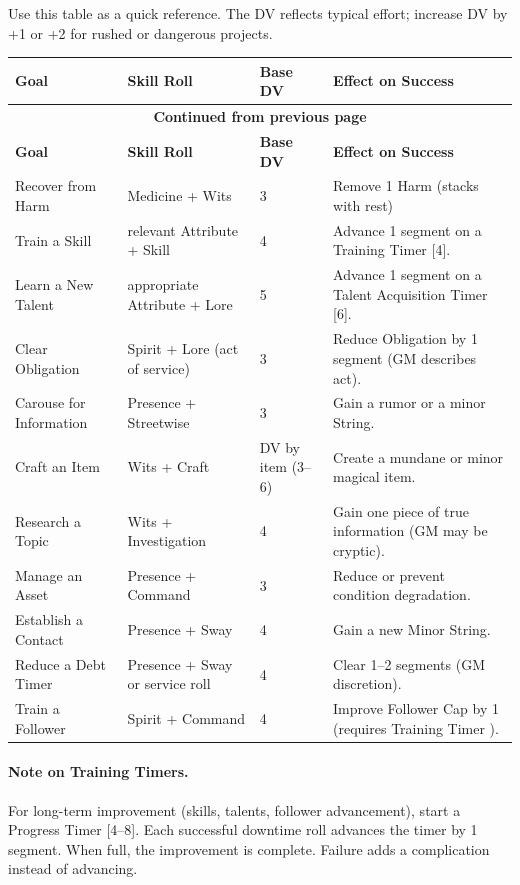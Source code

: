 Use this table as a quick reference. The DV reflects typical effort; increase DV by +1 or +2 for rushed or dangerous projects.

\renewcommand{\arraystretch}{1.2}
\begin{longtable}{p{4cm}p{2.5cm}p{3cm}p{5cm}}
\toprule
\textbf{Goal} & \textbf{Skill Roll} & \textbf{Base DV} & \textbf{Effect on Success} \\
\midrule
\endfirsthead
\multicolumn{4}{c}{{\bfseries Continued from previous page}} \\
\toprule
\textbf{Goal} & \textbf{Skill Roll} & \textbf{Base DV} & \textbf{Effect on Success} \\
\midrule
\endhead
\bottomrule
\endfoot
Recover from Harm & Medicine + Wits & 3 & Remove 1 Harm (stacks with rest) \\
Train a Skill & relevant Attribute + Skill & 4 & Advance 1 segment on a Training Timer [4]. \\
Learn a New Talent & appropriate Attribute + Lore & 5 & Advance 1 segment on a Talent Acquisition Timer [6]. \\
Clear Obligation & Spirit + Lore (act of service) & 3 & Reduce Obligation by 1 segment (GM describes act). \\
Carouse for Information & Presence + Streetwise & 3 & Gain a rumor or a minor String. \\
Craft an Item & Wits + Craft & DV by item (3--6) & Create a mundane or minor magical item. \\
Research a Topic & Wits + Investigation & 4 & Gain one piece of true information (GM may be cryptic). \\
Manage an Asset & Presence + Command & 3 & Reduce or prevent condition degradation. \\
Establish a Contact & Presence + Sway & 4 & Gain a new Minor String. \\
Reduce a Debt Timer & Presence + Sway or service roll & 4 & Clear 1--2 segments (GM discretion). \\
Train a Follower & Spirit + Command & 4 & Improve Follower Cap by 1 (requires Training Timer ). \\
\end{longtable}

\paragraph{Note on Training Timers.} For long-term improvement (skills, talents, follower advancement), start a Progress Timer [4--8]. Each successful downtime roll advances the timer by 1 segment. When full, the improvement is complete. Failure adds a complication instead of advancing.

